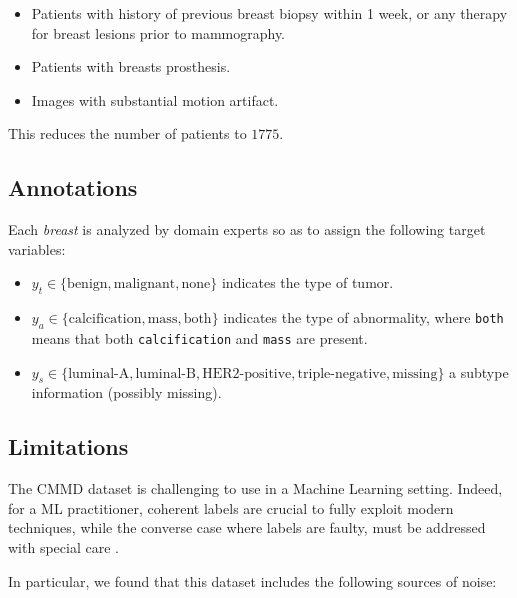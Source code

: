 \documentclass[11pt]{article}
\begin{document}
\begin{itemize}
\item Patients with history of previous breast biopsy within 1 week, or any therapy for breast lesions
prior to mammography.
\item Patients with breasts prosthesis.
\item Images with substantial motion artifact.
\end{itemize}

This reduces the number of patients to \(1775\).
\subsection{Annotations}
\label{sec:org908c369}

Each \emph{breast} is analyzed by domain experts so as to assign the following
target variables:

\begin{itemize}
\item \(y_{t} \in \{\text{benign}, \text{malignant}, \text{none}\}\) indicates the type of tumor.
\item \(y_{a} \in \{\text{calcification}, \text{mass}, \text{both}\}\) indicates the type of abnormality, where \texttt{both} means that both \texttt{calcification} and \texttt{mass} are present.
\item \(y_s \in \{\text{luminal-A}, \text{luminal-B},\text{HER2-positive},\text{triple-negative},\text{missing}\}\) a
subtype information (possibly missing).
\end{itemize}
\subsection{\label{limitations}Limitations}
\label{sec:org146bd61}

The CMMD dataset is challenging to use in a Machine Learning setting.
Indeed, for a ML practitioner, coherent labels are crucial to fully exploit
modern techniques, while the converse case where labels are faulty, must
be addressed with special care \autocite{song22}.

In particular, we found that this dataset includes the following sources of noise:
\end{document}
